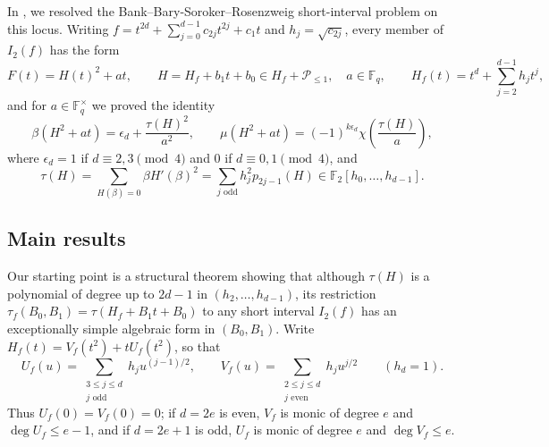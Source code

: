 \documentclass[11pt,a4paper]{amsart}
\theoremstyle{remark}
\numberwithin{equation}{section}
\newcommand{\Fq}{\mathbb{F}_q}
\newcommand{\Ftwo}{\mathbb{F}_2}
\newcommand{\Pe}{\mathcal{P}}
\begin{document}
In \cite{ChenShort}, we resolved the Bank--Bary-Soroker--Rosenzweig short-interval problem \cite{BBR} on this locus.
Writing $f=t^{2d}+\sum_{j=0}^{d-1}c_{2j}t^{2j}+c_1t$ and $h_j=\sqrt{c_{2j}}$, every member of $I_2(f)$ has the form
\begin{equation}\label{eq:F-form}
F(t)=H(t)^2+at,\qquad H=H_f+b_1t+b_0\in H_f+\Pe_{\le 1},\quad a\in\Fq,\qquad
H_f(t)=t^d+\sum_{j=2}^{d-1}h_j t^j,
\end{equation}
and for $a\in\Fq^\times$ we proved the identity \cite[Proposition~2.2]{ChenShort}
\begin{equation}\label{eq:parity-law}
\beta(H^2+at)=\epsilon_d+\frac{\tau(H)^2}{a^2},\qquad
\mu(H^2+at)=(-1)^{k\epsilon_d}\chi\!\left(\frac{\tau(H)}{a}\right),
\end{equation}
where $\epsilon_d=1$ if $d\equiv 2,3\pmod 4$ and $0$ if $d\equiv 0,1\pmod 4$, and
\begin{equation}\label{eq:tau-def}
\tau(H)=\sum_{H(\beta)=0}\beta H'(\beta)^2=\sum_{j\text{ odd}}h_j^2 p_{2j-1}(H)\in\Ftwo[h_0,\dots,h_{d-1}].
\end{equation}

\subsection{Main results}
Our starting point is a structural theorem showing that although $\tau(H)$ is a polynomial of degree up to $2d-1$ in
$(h_2,\dots,h_{d-1})$, its restriction $\tau_f(B_0,B_1)=\tau(H_f+B_1t+B_0)$ to any short interval $I_2(f)$ has an
exceptionally simple algebraic form in $(B_0,B_1)$. Write $H_f(t)=V_f(t^2)+tU_f(t^2)$, so that
\[
U_f(u)=\sum_{\substack{3\le j\le d\\ j\text{ odd}}}h_j u^{(j-1)/2},\qquad
V_f(u)=\sum_{\substack{2\le j\le d\\ j\text{ even}}}h_j u^{j/2}\qquad(h_d=1).
\]
Thus $U_f(0)=V_f(0)=0$; if $d=2e$ is even, $V_f$ is monic of degree $e$ and $\deg U_f\le e-1$, and if $d=2e+1$ is
odd, $U_f$ is monic of degree $e$ and $\deg V_f\le e$.
\end{document}
